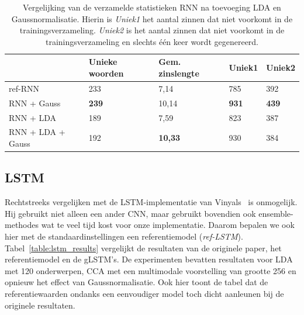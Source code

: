 \begin{table}
	\centering
	\begin{tabular}{lllll}
		~                 & Unieke woorden & Gem. zinslengte & Uniek1 & Uniek2 \\ \hline
		ref-RNN           & 233            & 7,14           & 785    & 392    \\
		RNN + Gauss       & \textbf{239}   & 10,14          & \textbf{931}    & \textbf{439}    \\
		RNN + LDA         & 189            & 7,59           & 823    & 387    \\
		RNN + LDA + Gauss & 192            & \textbf{10,33}          & 930    & 384    \\\hline
	\end{tabular}
	\caption[Vergelijking van de verzamelde statistieken RNN na toevoeging LDA en Gaussnormalisatie]{Vergelijking van de verzamelde statistieken RNN na toevoeging LDA en Gaussnormalisatie. Hierin is \emph{Uniek1} het aantal zinnen dat niet voorkomt in de trainingsverzameling. \emph{Uniek2} is het aantal zinnen dat niet voorkomt in de trainingsverzameling en slechts \'e\'en keer wordt gegenereerd.}
	\label{table:rnn_lda_stats}
\end{table}

\subsection{LSTM}
Rechtstreeks vergelijken met de LSTM-implementatie van Vinyals~\cite{Google} is onmogelijk. Hij gebruikt niet alleen een ander CNN, maar gebruikt bovendien ook ensemble-methodes wat te veel tijd kost voor onze implementatie. Daarom bepalen we ook hier met de standaardinstellingen een referentiemodel (\emph{ref-LSTM}). Tabel~\ref{table:lstm_results} vergelijkt de resultaten van de originele paper, het referentiemodel en de gLSTM's. De experimenten bevatten resultaten voor LDA met 120 onderwerpen, CCA met een multimodale voorstelling van grootte 256 en opnieuw het effect van Gaussnormalisatie. Ook hier toont de tabel dat de referentiewaarden ondanks een eenvoudiger model toch dicht aanleunen bij de originele resultaten. 

